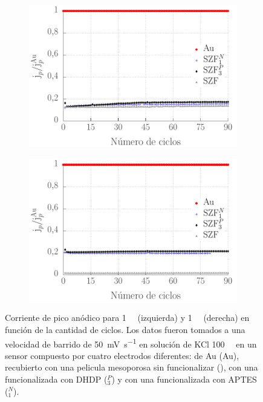 {		\begin{figure}[b!]
		 	\begin{subfigure}[t]{0.495\textwidth}
		 	  \includegraphics[width=\textwidth]{Graficos/ciclosintferroceno.pdf}
		      \end{subfigure}
			\begin{subfigure}[t]{0.495\textwidth}
		 	    \includegraphics[width=\textwidth]{Graficos/ciclosintfecn.pdf}
			\end{subfigure}
		      	\caption[Corriente de pico de \fc\space y \fe\space en función del número de ciclos]{Corriente de pico anódico para \fc\space \SI{1}{\milli\Molar} (izquierda) y  \fe\space \SI{1}{\milli\Molar} (derecha) en función de la cantidad de ciclos. Los datos fueron tomados a una velocidad de barrido de \SI{50}{\milli\volt\per\second} en solución de KCl \SI{100}{\milli\Molar} en un sensor compuesto por cuatro electrodos diferentes: de Au (Au), recubierto con una pelicula mesoporosa sin funcionalizar (\pdmZ), con una funcionalizada con DHDP (\pdmZ$^P_3$) y con una funcionalizada con APTES (\pdmZ$^N_1$).}
		      	\label{fig:ciclos-fe-fcoh}
		      	\end{figure}
		     		
}
